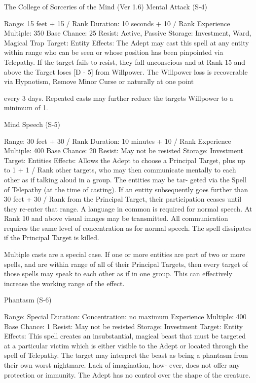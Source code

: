 \begin{Chapter}{The College of Sorceries of the Mind (Ver 1.6)}
Mental Attack (S-4) 

Range: 15 feet + 15 / Rank 
Duration: 10 seconds + 10 / Rank 
Experience Multiple: 350 
Base Chance: 25%
Resist: Active, Passive 
Storage: Investment, Ward, Magical Trap 
Target: Entity 
Effects: The Adept may cast this spell at any entity 
within  range  who  can  be  seen  or  whose  position 
has  been  pinpointed  via  Telepathy.  If  the  target 
fails to resist, they fall unconscious and at Rank 15 
and above the Target loses [D - 5] from Willpower. 
The Willpower  loss is  recoverable  via  Hypnotism, 
Remove  Minor  Curse  or  naturally  at  one  point 

every  3  days.  Repeated  casts  may  further  reduce 
the targets Willpower to a minimum of 1. 

Mind Speech (S-5) 

Range: 30 feet + 30 / Rank 
Duration: 10 minutes + 10 / Rank 
Experience Multiple: 400 
Base Chance: 20%
Resist: May not be resisted 
Storage: Investment 
Target: Entities 
Effects:  Allows  the  Adept  to  choose  a  Principal 
Target,  plus up  to  1  + 1  /  Rank  other  targets,  who 
may then communicate mentally to each other as if 
talking  aloud  in  a  group.  The  entities  may  be  tar-
geted  via  the  Spell  of  Telepathy  (at  the  time  of 
casting). If an entity subsequently goes further than 
30 feet + 30 / Rank from the Principal Target, their 
participation  ceases  until  they  re-enter  that  range. 
A  language  in  common  is  required  for  normal 
speech.  At  Rank  10  and  above  visual  images  may 
be  transmitted.  All  communication  requires  the 
same  level  of  concentration  as  for  normal  speech. 
The spell dissipates if the Principal Target is killed. 

Multiple  casts  are  a  special  case.  If  one  or  more 
entities  are  part  of  two  or  more  spells,  and  are 
within  range  of  all  of  their  Principal  Targets,  then 
every target of those spells may speak to each other 
as if in one group. This can effectively increase the 
working range of the effect. 

Phantasm (S-6) 

Range: Special 
Duration: Concentration: no maximum 
Experience Multiple: 400 
Base Chance: 1%
Resist: May not be resisted 
Storage: Investment 
Target: Entity 
Effects: This spell creates an insubstantial, magical 
beast  that  must  be  targeted  at  a  particular  victim 
which  is  either  visible  to  the  Adept  or  located 
through  the  spell  of  Telepathy.  The  target  may 
interpret  the  beast  as  being  a  phantasm  from  their 
own  worst  nightmare.  Lack  of  imagination,  how-
ever,  does  not  offer  any  protection  or  immunity. 
The  Adept  has  no  control  over  the  shape  of  the 
creature. 


\end{Chapter}

